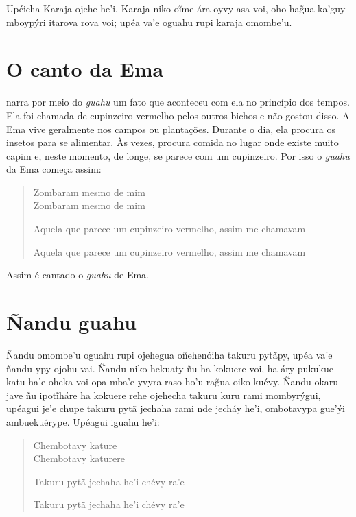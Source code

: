 
Upéicha Karaja ojehe he'i. Karaja niko oĩme ára oyvy asa voi, oho hag̃ua
ka'guy mboypýri itarova rova voi; upéa va'e oguahu rupi karaja omombe'u.

\chapter{O canto da Ema}

 narra por meio do \emph{guahu} um fato que aconteceu com ela no
princípio dos tempos. Ela foi chamada de cupinzeiro vermelho pelos
outros bichos e não gostou disso. A Ema vive geralmente nos campos ou
plantações. Durante o dia, ela procura os insetos para se alimentar. Às
vezes, procura comida no lugar onde existe muito capim e, neste momento,
de longe, se parece com um cupinzeiro. Por isso o \emph{guahu} da Ema
começa assim:

\begin{verse}
Zombaram mesmo de mim\\
Zombaram mesmo de mim

Aquela que parece um cupinzeiro vermelho, assim me chamavam

Aquela que parece um cupinzeiro vermelho, assim me chamavam
\end{verse}

Assim é cantado o \emph{guahu} de Ema.

\chapter{Ñandu guahu}

Ñandu omombe'u oguahu rupi ojehegua oñehenóiha takuru pytãpy, upéa va'e
ñandu ypy ojohu vai. Ñandu niko hekuaty ñu ha kokuere voi, ha áry
pukukue katu ha'e oheka voi opa mba'e yvyra raso ho'u rag̃ua oiko kuévy.
Ñandu okaru jave ñu ipotĩháre ha kokuere rehe ojehecha takuru kuru rami
mombyrýgui, upéagui je'e chupe takuru pytã jechaha rami nde jecháy he'i,
ombotavypa gue'ýi ambuekuérype. Upéagui iguahu he'i:

\begin{verse}
Chembotavy kature\\
Chembotavy katurere

Takuru pytã jechaha he'i chévy ra'e

Takuru pytã jechaha he'i chévy ra'e
\end{verse}



